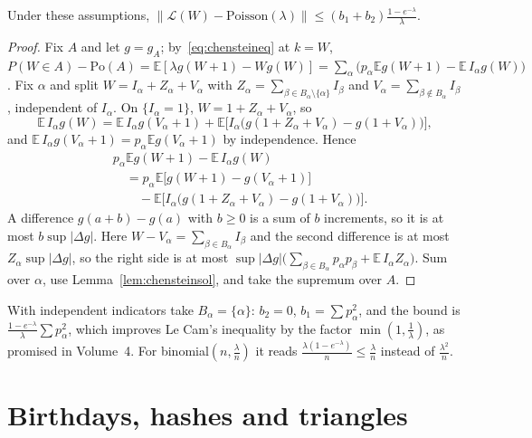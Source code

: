 \begin{theorem}\label{thm:chenstein}
Under these assumptions, $\displaystyle\|\mathcal L(W)-\text{Poisson}(\lambda)\|\le(b_1+b_2)\frac{1-e^{-\lambda}}\lambda$.
\end{theorem}
\begin{proof}
Fix $A$ and let $g=g_A$; by~\eqref{eq:chensteineq} at $k=W$, $P(W\in A)-\mathrm{Po}(A)=\mathbb E[\lambda g(W+1)-Wg(W)]=\sum_\alpha\bigl(p_\alpha\mathbb Eg(W+1)-\mathbb E\,I_\alpha g(W)\bigr)$.
Fix $\alpha$ and split $W=I_\alpha+Z_\alpha+V_\alpha$ with $Z_\alpha=\sum_{\beta\in B_\alpha\setminus\{\alpha\}}I_\beta$ and $V_\alpha=\sum_{\beta\notin B_\alpha}I_\beta$, independent of $I_\alpha$.
On $\{I_\alpha=1\}$, $W=1+Z_\alpha+V_\alpha$, so
\[
\mathbb E\,I_\alpha g(W)=\mathbb E\,I_\alpha g(V_\alpha+1)+\mathbb E\bigl[I_\alpha\bigl(g(1+Z_\alpha+V_\alpha)-g(1+V_\alpha)\bigr)\bigr],
\]
and $\mathbb E\,I_\alpha g(V_\alpha+1)=p_\alpha\mathbb Eg(V_\alpha+1)$ by independence. Hence
\[
\begin{aligned}
&p_\alpha\mathbb Eg(W+1)-\mathbb E\,I_\alpha g(W)\\
&\quad=p_\alpha\mathbb E\bigl[g(W+1)-g(V_\alpha+1)\bigr]\\
&\qquad-\mathbb E\bigl[I_\alpha\bigl(g(1+Z_\alpha+V_\alpha)-g(1+V_\alpha)\bigr)\bigr].
\end{aligned}
\]
A difference $g(a+b)-g(a)$ with $b\ge0$ is a sum of $b$ increments, so it is at most $b\sup|\Delta g|$. Here $W-V_\alpha=\sum_{\beta\in B_\alpha}I_\beta$ and the second
difference is at most $Z_\alpha\sup|\Delta g|$, so the right side is at most $\sup|\Delta g|\bigl(\sum_{\beta\in B_\alpha}p_\alpha p_\beta+\mathbb E\,I_\alpha Z_\alpha\bigr)$.
Sum over $\alpha$, use Lemma~\ref{lem:chensteinsol}, and take the supremum over $A$.
\end{proof}

With independent indicators take $B_\alpha=\{\alpha\}$: $b_2=0$, $b_1=\sum p_\alpha^2$, and the bound is $\frac{1-e^{-\lambda}}\lambda\sum p_\alpha^2$, which improves Le Cam's
inequality by the factor $\min(1,\frac1\lambda)$, as promised in Volume~4. For binomial$(n,\frac\lambda n)$ it reads $\frac{\lambda(1-e^{-\lambda})}n\le\frac\lambda n$ instead of $\frac{\lambda^2}n$.

\section{Birthdays, hashes and triangles}

